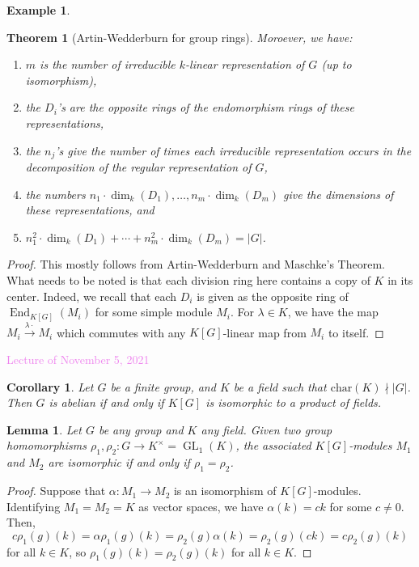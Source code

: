 \documentclass{amsart}[12pt]
\def\End{\operatorname{End}}
\newcommand{\Nov}[1]{\textcolor{violet}{Lecture of November #1, 2021}}
\numberwithin{equation}{section}
\theoremstyle{plain} %
\newtheorem{thm}[equation]{Theorem}
\newtheorem{cor}[equation]{Corollary}
\newtheorem{lem}[equation]{Lemma}
\theoremstyle{definition}
\newtheorem{ex}[equation]{Example}
\theoremstyle{remark}
\newcommand{\GL}{\operatorname{GL}}
\begin{document}
\begin{ex}
\begin{thm}[Artin-Wedderburn for group rings]
Moroever, we have:
\begin{enumerate}
\item $m$ is the number of irreducible $k$-linear representation of $G$ (up to isomorphism),
\item the $D_i$'s are the opposite rings of the endomorphism rings of these representations,
\item  the $n_j$'s give the number of times each irreducible representation occurs in the decomposition of the regular representation of $G$,
\item the numbers $n_1 \cdot \dim_k(D_1), \dots, n_m \cdot \dim_k(D_m)$ give the dimensions of these representations, and
\item $n_1^2 \cdot \dim_k(D_1) + \cdots + n_m^2 \cdot \dim_k(D_m) = |G|$.
\end{enumerate}
\end{thm}
\begin{proof} This mostly follows from Artin-Wedderburn and Maschke's Theorem. What needs to be noted is that each division ring here contains a copy of $K$ in its center.
 Indeed, we recall that each $D_i$ is given as the opposite ring of $\End_{K[G]}(M_i)$ for some simple module $M_i$. For $\lambda\in K$, we have the map $M_i \xrightarrow{\lambda \cdot} M_i$ which commutes with any $K[G]$-linear map from $M_i$ to itself.
\end{proof}

\Nov{5}
\begin{cor} Let $G$ be a finite group, and $K$ be a field such that $\mathrm{char}(K) \nmid |G|$. Then $G$ is abelian if and only if $K[G]$ is isomorphic to a product of fields.
\end{cor}



\begin{lem} 
Let $G$ be any group and $K$ any field. Given two group homomorphisms $\rho_1, \rho_2: G \to K^\times = \GL_1(K)$, the associated $K[G]$-modules $M_1$ and $M_2$ are isomorphic if and only if $\rho_1 =\rho_2$. 
\end{lem}

\begin{proof}
Suppose that $\alpha:M_1 \to M_2$ is an isomorphism of $K[G]$-modules. Identifying $M_1=M_2=K$ as vector spaces, we have $\alpha(k) = ck$ for some $c\neq 0$. Then, \[ c \rho_1(g) (k) = \alpha \rho_1(g) (k) = \rho_2(g) \alpha(k) = \rho_2(g) (ck) = c \rho_2(g) (k)\] for all $k\in K$, so $\rho_1(g)(k)=\rho_2(g)(k)$ for all $k\in K$.
\end{proof}


\end{ex}
\end{document}
